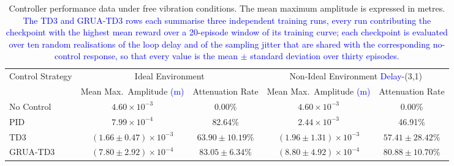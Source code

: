 \begin{table}[htbp]
\centering
\caption{Controller performance data under free vibration conditions. The mean maximum amplitude is expressed in metres. \textcolor{blue}{The TD3 and GRUA-TD3 rows each summarise three independent training runs, every run contributing the checkpoint with the highest mean reward over a 20-episode window of its training curve; each checkpoint is evaluated over ten random realisations of the loop delay and of the sampling jitter that are shared with the corresponding no-control response, so that every value is the mean $\pm$ standard deviation over thirty episodes.}}
\label{tab:free_vib_data}
\footnotesize
\setlength{\tabcolsep}{3.5pt}
\begin{tabular}{lcccc}
\toprule
\multirow{2}{*}{Control Strategy} & \multicolumn{2}{c}{Ideal Environment} & \multicolumn{2}{c}{Non-Ideal Environment \textcolor{blue}{Delay}-(3,1)} \\
\cline{2-5}
& Mean Max.\ Amplitude \textcolor{blue}{(m)} & Attenuation Rate & Mean Max.\ Amplitude \textcolor{blue}{(m)} & Attenuation Rate \\ \midrule
No Control & $4.60\times10^{-3}$ & 0.00\% & $4.60\times10^{-3}$ & 0.00\% \\
PID & $7.99\times10^{-4}$ & 82.64\% & $2.44\times10^{-3}$ & 46.91\% \\
TD3 & $(1.66\pm0.47)\times10^{-3}$ & $63.90\pm10.19$\% & $(1.96\pm1.31)\times10^{-3}$ & $57.41\pm28.42$\% \\
GRUA-TD3 & $(7.80\pm2.92)\times10^{-4}$ & $83.05\pm6.34$\% & $(8.80\pm4.92)\times10^{-4}$ & $80.88\pm10.70$\% \\
\bottomrule
\end{tabular}
\end{table}

